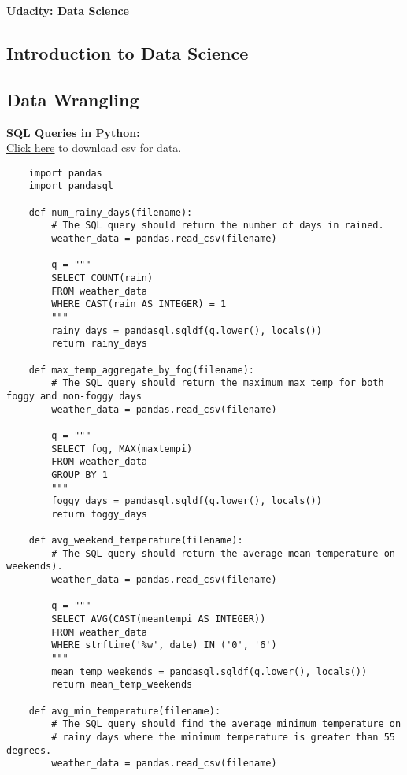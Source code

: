 \documentclass[11pt, a4paper]{article}
\begin{document}
	\begin{titlepage}
		\begin{center} \Huge \textbf{Udacity: Data Science} \end{center}
		\tableofcontents
		\newpage
	\end{titlepage}

	\begin{spacing}{1.1}
	\section{Introduction to Data Science}
	\subsection{Data Wrangling}
	\textbf{SQL Queries in Python:}\vspace*{1mm}\\
	\href{https://s3.amazonaws.com/content.udacity-data.com/courses/ud359/weather_underground.csv}{Click here} to download csv for data.
	\begin{lstlisting}
	import pandas
	import pandasql
	
	def num_rainy_days(filename):
		# The SQL query should return the number of days in rained.
		weather_data = pandas.read_csv(filename)
		
		q = """
		SELECT COUNT(rain)
		FROM weather_data
		WHERE CAST(rain AS INTEGER) = 1
		"""
		rainy_days = pandasql.sqldf(q.lower(), locals())
		return rainy_days
	
	def max_temp_aggregate_by_fog(filename):
		# The SQL query should return the maximum max temp for both foggy and non-foggy days
		weather_data = pandas.read_csv(filename)
		
		q = """
		SELECT fog, MAX(maxtempi)
		FROM weather_data
		GROUP BY 1
		"""
		foggy_days = pandasql.sqldf(q.lower(), locals())
		return foggy_days
	
	def avg_weekend_temperature(filename):
		# The SQL query should return the average mean temperature on weekends).
		weather_data = pandas.read_csv(filename)
		
		q = """
		SELECT AVG(CAST(meantempi AS INTEGER))
		FROM weather_data
		WHERE strftime('%w', date) IN ('0', '6')
		"""
		mean_temp_weekends = pandasql.sqldf(q.lower(), locals())
		return mean_temp_weekends
	
	def avg_min_temperature(filename):
		# The SQL query should find the average minimum temperature on 
		# rainy days where the minimum temperature is greater than 55 degrees.
		weather_data = pandas.read_csv(filename)
		

\end{lstlisting}
\end{spacing}
\end{document}
